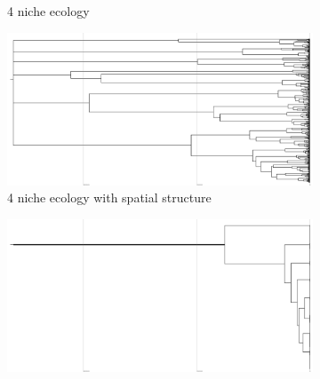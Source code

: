 \begin{figure}
\begin{subfigure}[b]{0.5\columnwidth}
    \caption{%
      4 niche ecology}
  \end{subfigure}
  \hfill
  \begin{subfigure}[b]{0.5\columnwidth}
    \includegraphics[height=0.12\textheight,width=\textwidth]{img/perfect-tree-phylogenies-log/epoch=7+resolution=3+treatment=22/a=collapsed-phylogeny+epoch=00007+mut_distn=np.random.standard_normal+num_generations=32768+num_islands=1024+num_niches=4+p_island_migration=0.01+p_niche_invasion=3.0517578125e-08+population_size=3276.../8+replicate=0+tournament_size=2+treatment=22+_generation=262144+_index=22+scale=nonlog+ext=.pdf}
    \caption{%
      4 niche ecology with spatial structure}
  \end{subfigure}
  \hfill
  \begin{subfigure}[b]{0.5\columnwidth}
    \includegraphics[height=0.12\textheight,width=\textwidth]{img/perfect-tree-phylogenies-log/epoch=7+resolution=3+treatment=20/a=collapsed-phylogeny+epoch=00007+mut_distn=np.random.standard_normal+num_generations=32768+num_islands=1+num_niches=8+p_island_migration=0.01+p_niche_invasion=3.0517578125e-08+population_size=32768+r.../eplicate=0+tournament_size=2+treatment=20+_generation=262144+_index=20+scale=nonlog+ext=.pdf}

\end{subfigure}
\end{figure}
